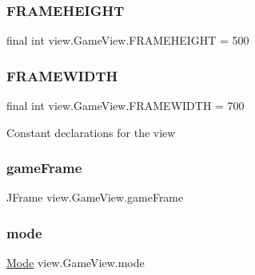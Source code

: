 \subsubsection{\texorpdfstring{F\+R\+A\+M\+E\+H\+E\+I\+G\+HT}{FRAMEHEIGHT}}
{\footnotesize\ttfamily final int view.\+Game\+View.\+F\+R\+A\+M\+E\+H\+E\+I\+G\+HT = 500\hspace{0.3cm}{\ttfamily [private]}}

\hypertarget{classview_1_1_game_view_a2ab92f79dc374ff6708c7798697b623a}{}\label{classview_1_1_game_view_a2ab92f79dc374ff6708c7798697b623a} 
\subsubsection{\texorpdfstring{F\+R\+A\+M\+E\+W\+I\+D\+TH}{FRAMEWIDTH}}
{\footnotesize\ttfamily final int view.\+Game\+View.\+F\+R\+A\+M\+E\+W\+I\+D\+TH = 700\hspace{0.3cm}{\ttfamily [private]}}

Constant declarations for the view \hypertarget{classview_1_1_game_view_a7e90e32a71e4cbc5356dd2960290917c}{}\label{classview_1_1_game_view_a7e90e32a71e4cbc5356dd2960290917c} 
\subsubsection{\texorpdfstring{game\+Frame}{gameFrame}}
{\footnotesize\ttfamily J\+Frame view.\+Game\+View.\+game\+Frame\hspace{0.3cm}{\ttfamily [private]}}

\hypertarget{classview_1_1_game_view_a805dd6b76de78fe934f8c4287b4988ce}{}\label{classview_1_1_game_view_a805dd6b76de78fe934f8c4287b4988ce} 
\subsubsection{\texorpdfstring{mode}{mode}}
{\footnotesize\ttfamily \hyperlink{classview_1_1_mode}{Mode} view.\+Game\+View.\+mode\hspace{0.3cm}{\ttfamily [private]}}


